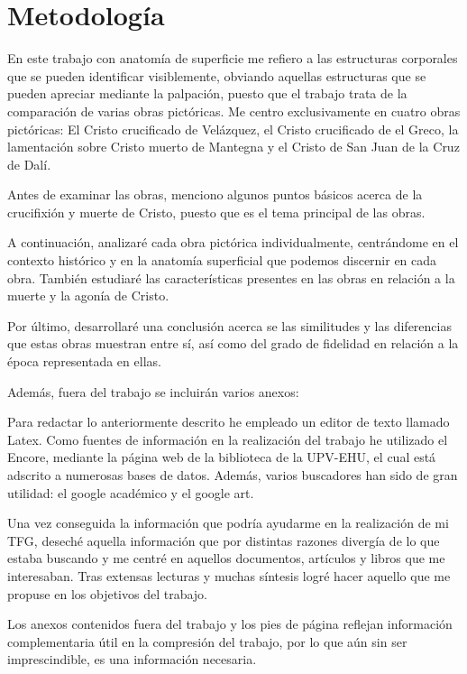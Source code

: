 \section{Metodología}
En este trabajo con anatomía de superficie me refiero a las estructuras corporales que se pueden identificar visiblemente, obviando aquellas estructuras que se pueden apreciar mediante la palpación, puesto que el trabajo trata de la comparación de varias obras pictóricas. Me centro exclusivamente en cuatro obras pictóricas: El Cristo crucificado de Velázquez, el Cristo crucificado de el Greco, la lamentación sobre Cristo muerto de Mantegna %
y el Cristo de San Juan de la Cruz de Dalí.


Antes de examinar las obras, menciono algunos puntos básicos acerca de la crucifixión y muerte de Cristo, puesto que es el tema principal de las obras.

A continuación, analizaré cada obra pictórica individualmente, centrándome en el contexto histórico y en la anatomía superficial que podemos discernir en cada obra. También estudiaré las características presentes en las obras en relación a la muerte y la agonía de Cristo.

Por último, desarrollaré una conclusión acerca se las similitudes y las diferencias que estas obras muestran entre sí, así como del grado de fidelidad en relación a la época representada en ellas.

Además, fuera del trabajo se incluirán varios anexos:

\vspace{12pt}

Para redactar lo anteriormente descrito he empleado un editor de texto llamado Latex. Como fuentes de información en la realización del trabajo he utilizado el Encore, mediante la página web de la biblioteca de la UPV-EHU, el cual está adscrito a numerosas bases de datos. Además, varios buscadores han sido de gran utilidad: el google académico y el google art.

Una vez conseguida la información que podría ayudarme en la realización de mi TFG, deseché aquella información que por distintas razones divergía de lo que estaba buscando y me centré en aquellos documentos, artículos y libros que me interesaban. Tras extensas lecturas y muchas síntesis logré hacer aquello que me propuse en los objetivos del trabajo.

Los anexos contenidos fuera del trabajo y los pies de página reflejan información complementaria útil en la compresión del trabajo, por lo que aún sin ser imprescindible, es una información necesaria.